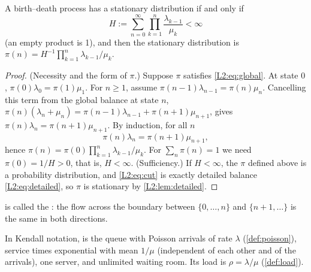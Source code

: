 \begin{theorem}\label{thm:birthdeath}
A birth--death process has a stationary distribution if and only if
\begin{equation}\label{L2:eq:bdsum}
  H:=\sum_{n=0}^{\infty}\prod_{k=1}^{n}\frac{\lambda_{k-1}}{\mu_k}<\infty
\end{equation}
(an empty product is 1), and then the stationary distribution is
$\pi(n)=H^{-1}\prod_{k=1}^{n}\lambda_{k-1}/\mu_k$.
\end{theorem}
\begin{proof}
(Necessity and the form of $\pi$.) Suppose $\pi$ satisfies \eqref{L2:eq:global}. At
state $0$, $\pi(0)\lambda_0=\pi(1)\mu_1$. For $n\ge1$, assume
$\pi(n-1)\lambda_{n-1}=\pi(n)\mu_n$. Cancelling this term from the global balance at
state $n$, $\pi(n)(\lambda_n+\mu_n)=\pi(n-1)\lambda_{n-1}+\pi(n+1)\mu_{n+1}$, gives
$\pi(n)\lambda_n=\pi(n+1)\mu_{n+1}$. By induction, for all $n$
\begin{equation}\label{L2:eq:cut}
  \pi(n)\lambda_n=\pi(n+1)\mu_{n+1},
\end{equation}
hence $\pi(n)=\pi(0)\prod_{k=1}^n\lambda_{k-1}/\mu_k$. For $\sum_n\pi(n)=1$ we need
$\pi(0)=1/H>0$, that is, $H<\infty$.
(Sufficiency.) If $H<\infty$, the $\pi$ defined above is a probability distribution,
and \eqref{L2:eq:cut} is exactly detailed balance \eqref{L2:eq:detailed}, so $\pi$ is
stationary by \cref{L2:lem:detailed}.
\end{proof}

 is called the : the flow across the boundary
between $\{0,\dots,n\}$ and $\{n+1,\dots\}$ is the same in both directions.

\begin{definition}[M/M/1 queue]\label{L2:def:mm1}
In Kendall notation,  is the queue with Poisson arrivals of rate $\lambda$
(\cref{def:poisson}), service times exponential with mean $1/\mu$ (independent of each
other and of the arrivals), one server, and unlimited waiting room. Its load is
$\rho=\lambda/\mu$ (\cref{def:load}).
\end{definition}

